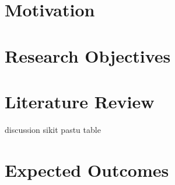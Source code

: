 \documentclass[12pt,a4paper,oneside]{article}
\begin{document}
\section{Motivation}

\section{Research Objectives}

\section{Literature Review}

discussion sikit pastu table

\section{Expected Outcomes}


\small{{}}
\end{document}

